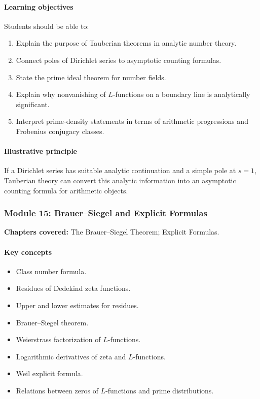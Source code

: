 \documentclass[11pt]{article}
\begin{document}
\paragraph{Learning objectives}
Students should be able to:
\begin{enumerate}
    \item Explain the purpose of Tauberian theorems in analytic number theory.
    \item Connect poles of Dirichlet series to asymptotic counting formulas.
    \item State the prime ideal theorem for number fields.
    \item Explain why nonvanishing of $L$-functions on a boundary line is analytically significant.
    \item Interpret prime-density statements in terms of arithmetic progressions and Frobenius conjugacy classes.
\end{enumerate}

\paragraph{Illustrative principle}
If a Dirichlet series has suitable analytic continuation and a simple pole at $s=1$, Tauberian theory can convert this analytic information into an asymptotic counting formula for arithmetic objects.

\subsubsection*{Module 15: Brauer--Siegel and Explicit Formulas}

\textbf{Chapters covered:} The Brauer--Siegel Theorem; Explicit Formulas.

\paragraph{Key concepts}
\begin{itemize}
    \item Class number formula.
    \item Residues of Dedekind zeta functions.
    \item Upper and lower estimates for residues.
    \item Brauer--Siegel theorem.
    \item Weierstrass factorization of $L$-functions.
    \item Logarithmic derivatives of zeta and $L$-functions.
    \item Weil explicit formula.
    \item Relations between zeros of $L$-functions and prime distributions.
\end{itemize}
\end{document}
